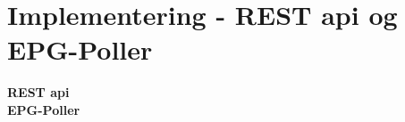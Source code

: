 \section{Implementering - REST api og EPG-Poller}\label{api_epg_implementering}
{\large\textbf{REST api}}\\

{\large\textbf{EPG-Poller}}\\

